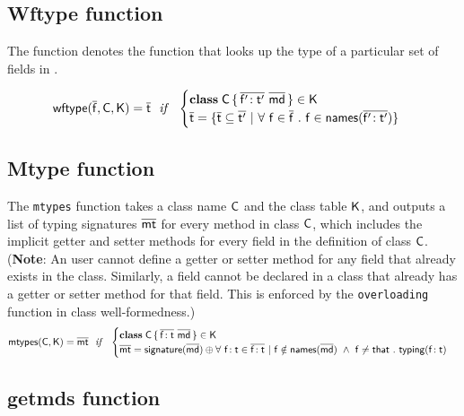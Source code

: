 \documentclass[acmlarge, anonymous, authordraft]{acmart}
\begin{document}
\subsection{Wftype function}

The function \wftype{\b\f}\C\K denotes the function that looks up the type of a particular set of fields in \C.

\begin{equation*}
\wftype{\b\f}\C\K = \b\t ~~\mathit{if}~~ \begin{cases}

 \Class \C {\b{\Ftype\fp\tp}}{\b\md} \in \K\\
 \b\t = \{ \b\t \subseteq \b\tp ~|~ \forall~ \f \in \b\f ~.~ \f \in \names{\b{\Ftype\fp\tp}} \} \\
 
\end{cases}
\end{equation*}

\subsection{Mtype function}

The \texttt{mtypes} function takes a class name ${\sf{C}}$ and the class table
${\sf{K}}$, and outputs a list of typing signatures $\overline{{\sf{mt}}}$ for every method in
class ${\sf{C}}$, which includes the implicit getter and setter methods for every
field in the definition of class ${\sf{C}}$.  (\textbf{Note}: An user cannot
define a getter or setter method for any field that already exists in the
class. Similarly, a field cannot be declared in a class that already has a
getter or setter method for that field. This is enforced by the
\texttt{overloading} function in class well-formedness.) \\

\begin{equation*}
\classoff\C\K = \b\mt ~~\mathit{if}~~ \begin{cases}

 \Class \C {\b{\Ftype\f\t}}{\b\md} \in \K\\
 \b\mt = \sign{\b\md} \oplus \forall ~\Ftype\f\t \in \b{\Ftype\f\t} ~|~ \f \notin \names{\b\md} ~\wedge~ \f\neq\that ~.~ \typez{\Ftype\f\t}

\end{cases}
\end{equation*}

\subsection{getmds function}
\end{document}
